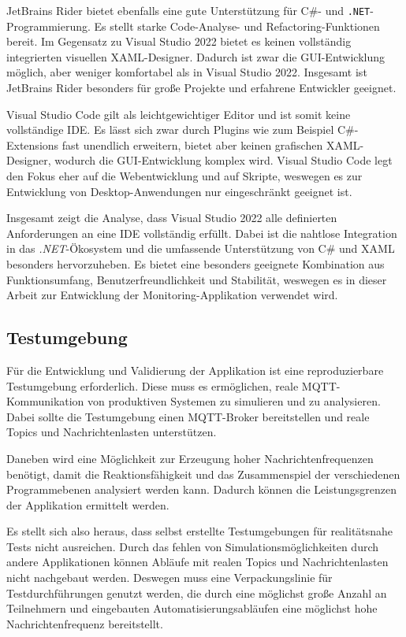         JetBrains Rider bietet ebenfalls eine gute Unterstützung für C\#- und \texttt{.NET}-Programmierung. Es stellt starke Code-Analyse- und Refactoring-Funktionen bereit.
        Im Gegensatz zu Visual Studio 2022 bietet es keinen vollständig integrierten visuellen XAML-Designer. Dadurch ist zwar die GUI-Entwicklung möglich, aber weniger 
        komfortabel als in Visual Studio 2022. Insgesamt ist JetBrains Rider besonders für große Projekte und erfahrene Entwickler geeignet. \autocite{RiderCrossplatformNET}

        Visual Studio Code gilt als leichtgewichtiger Editor und ist somit keine vollständige IDE. Es lässt sich zwar durch Plugins wie zum Beispiel C\#-Extensions
        fast unendlich erweitern, bietet aber keinen grafischen XAML-Designer, wodurch die GUI-Entwicklung komplex wird. Visual Studio Code legt den Fokus eher auf 
        die Webentwicklung und auf Skripte, weswegen es zur Entwicklung von Desktop-Anwendungen nur eingeschränkt geeignet ist. \autocite{Working}

        Insgesamt zeigt die Analyse, dass Visual Studio 2022 alle definierten Anforderungen an eine IDE vollständig erfüllt. Dabei ist die nahtlose Integration
        in das \textit{.NET}-Ökosystem und die umfassende Unterstützung von C\# und XAML besonders hervorzuheben. Es bietet eine besonders geeignete Kombination aus Funktionsumfang, Benutzerfreundlichkeit und Stabilität, weswegen es in dieser Arbeit zur Entwicklung der Monitoring-Applikation verwendet
        wird.

    \subsection{Testumgebung}
        Für die Entwicklung und Validierung der Applikation ist eine reproduzierbare Testumgebung erforderlich. Diese muss es ermöglichen, reale MQTT-Kommunikation 
        von produktiven Systemen zu simulieren und zu analysieren. Dabei sollte die Testumgebung einen MQTT-Broker bereitstellen und reale Topics und Nachrichtenlasten 
        unterstützen.

        Daneben wird eine Möglichkeit zur Erzeugung hoher Nachrichtenfrequenzen benötigt, damit die Reaktionsfähigkeit und das Zusammenspiel der verschiedenen Programmebenen 
        analysiert werden kann. Dadurch können die Leistungsgrenzen der Applikation ermittelt werden.

        Es stellt sich also heraus, dass selbst erstellte Testumgebungen für realitätsnahe Tests nicht ausreichen. Durch das fehlen von Simulationsmöglichkeiten durch andere Applikationen können Abläufe mit realen Topics und Nachrichtenlasten nicht nachgebaut werden. Deswegen muss eine Verpackungslinie für Testdurchführungen genutzt werden, die durch eine möglichst große Anzahl an Teilnehmern und eingebauten Automatisierungsabläufen eine möglichst hohe Nachrichtenfrequenz bereitstellt.

